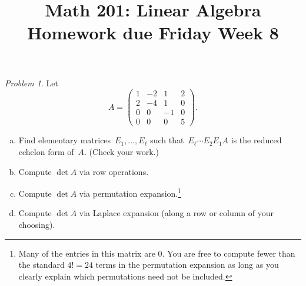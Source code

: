 \documentclass[11pt,twoside]{amsart}
\title{Math 201: Linear Algebra\\ Homework due Friday Week 8}
\theoremstyle{plain}
\theoremstyle{remark}
\newtheorem{prob}{Problem}
\theoremstyle{definition}
\theoremstyle{definition}
\begin{document}
\maketitle

\begin{prob}
Let
\[
  A = \begin{pmatrix} 1 & -2 & 1 & 2\\ 2 & -4 & 1 & 0 \\ 0 & 0 & -1 &
      0\\ 0& 0 & 0 & 5 \end{pmatrix}.
\]
\begin{enumerate}[(a)]
\item Find elementary matrices~$E_1,\dots,E_{\ell}$ such
    that~$E_{\ell}\cdots E_2 E_1 A$ is the reduced echelon form of~$A$. (Check
      your work.)
\item Compute $\det A$ via row operations.
\item Compute $\det A$ via permutation expansion.\footnote{Many of the entries in this matrix are $0$. You are free to compute fewer than the standard $4!=24$ terms in the permutation expansion as long as you clearly explain which permutations need not be included.}
\item Compute $\det A$ via Laplace expansion (along a row or column of your choosing).
\end{enumerate}
\end{prob}
\end{document}
